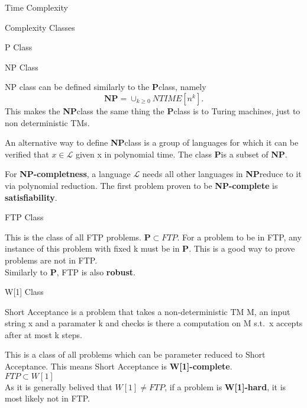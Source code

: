 \documentclass[12pt, letterpaper]{article}
\newcommand{\Ll}{\mathscr{L}}
\newcommand{\Ls}{\(\Ll\)}
\newcommand{\p}{\textbf{P}}
\newcommand{\n}{\textbf{NP}}
\begin{document}
\begin{section}{Time Complexity}
\begin{subsection}{Complexity Classes}
\begin{subsubsection}{P Class}
    \end{subsubsection}

    \begin{subsubsection}{NP Class}

      NP class can be defined similarly to the \p class, namely \[\n =
        \cup_{k \geq 0} NTIME[n^{k}].\] This makes the \n class the same thing
      the \p class is to Turing machines, just to non deterministic TMs.

      An alternative way to define \n class is a group of languages for which
      it can be verified that \(x \in \Ll\) given x in polynomial time. The
      class \p is a subset of \n.

      For \textbf{NP-completness}, a language \Ls{} needs all other languages
      in \n reduce to it via polynomial reduction. The first problem proven to
      be \textbf{NP-complete} is \textbf{satisfiability}.

    \end{subsubsection}

    \begin{subsubsection}{FTP Class}

      This is the class of all FTP problems. \(\p \subset FTP\). For a problem
      to be in FTP, any instance of this problem with fixed k must be in \p.
      This is a good way to prove problems are not in FTP. \\
      Similarly to \p, FTP is also \textbf{robust}.

    \end{subsubsection}

    \begin{subsubsection}{W[1] Class}

      Short Acceptance is a problem that takes a non-deterministic TM M, an
      input string x and a paramater k and checks is there a computation on M
      s.t.\ x accepts after at most k steps.

      This is a class of all problems which can be parameter reduced to Short
      Acceptance. This means Short Acceptance is \textbf{W[1]-complete}. \\
      \(FTP \subset W[1]\) \\
      As it is generally belived that \(W[1] \neq FTP\), if a problem is
      \textbf{W[1]-hard}, it is most likely not in FTP.

    \end{subsubsection}

  \end{subsection}


\end{section}
\end{document}
